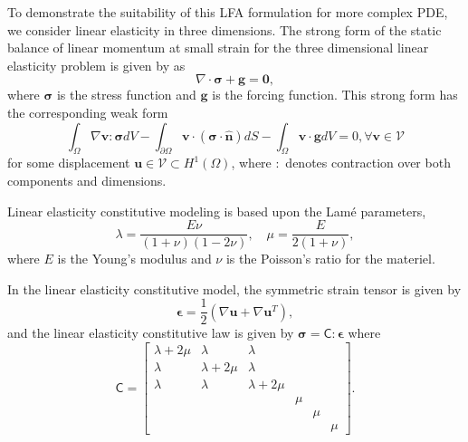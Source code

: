 \documentclass[review]{siamart190516}
\begin{document}
To demonstrate the suitability of this LFA formulation for more complex PDE, we consider linear elasticity in three dimensions.
The strong form of the static balance of linear momentum at small strain for the three dimensional linear elasticity problem is given by \cite{hughes2012finite} as
\begin{equation}
\nabla \cdot \boldsymbol{\sigma} + \boldsymbol{g} = \boldsymbol{0},
\end{equation}
where $\boldsymbol{\sigma}$ is the stress function and $\boldsymbol{g}$ is the forcing function.
This strong form has the corresponding weak form
\begin{equation}
\int_{\Omega} \nabla \mathbf{v} : \boldsymbol{\sigma} dV - \int_{\partial \Omega} \mathbf{v} \cdot \left( \boldsymbol{\sigma} \cdot \hat{\mathbf{n}} \right) dS - \int_{\Omega} \mathbf{v} \cdot \mathbf{g} dV = 0, \forall \mathbf{v} \in \mathcal{V}
\end{equation}
for some displacement $\mathbf{u} \in \mathcal{V} \subset H^1 \left( \Omega \right)$, where $:$ denotes contraction over both components and dimensions.

Linear elasticity constitutive modeling is based upon the Lamé parameters,
\begin{equation}
\lambda  = \frac{E \nu}{\left( 1 + \nu \right) \left( 1 - 2 \nu \right)},\quad  \mu  = \frac{E}{2 \left( 1 + \nu \right)},
\end{equation}
where $E$ is the Young's modulus and $\nu$ is the Poisson's ratio for the materiel.

In the linear elasticity constitutive model, the symmetric strain tensor is given by
\begin{equation}
\boldsymbol{\epsilon} = \frac{1}{2} \left( \nabla \mathbf{u} + \nabla \mathbf{u}^T \right),
\end{equation}
and the linear elasticity constitutive law is given by $\boldsymbol{\sigma} = \mathsf{C} : \boldsymbol{\epsilon}$ where
\begin{equation}
\mathsf{C} =
\begin{bmatrix}
   \lambda + 2\mu & \lambda & \lambda & & & \\
   \lambda & \lambda + 2\mu & \lambda & & & \\
   \lambda & \lambda & \lambda + 2\mu & & & \\
   & & & \mu & & \\
   & & & & \mu & \\
   & & & & & \mu
\end{bmatrix}.
\end{equation}
\end{document}
